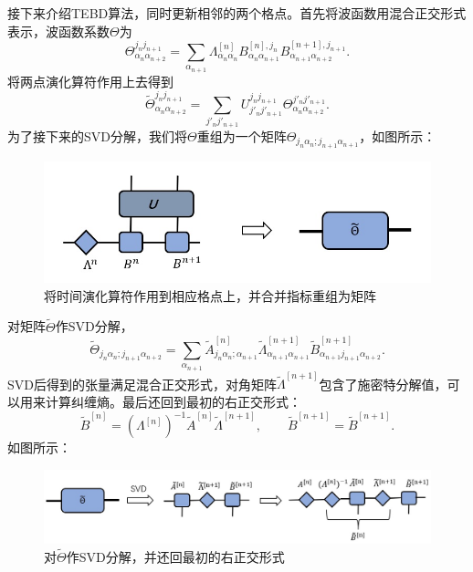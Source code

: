 \documentclass[12pt]{article}
\begin{document}
     接下来介绍TEBD算法\cite{hauschild2018efficient}，同时更新相邻的两个格点。首先将波函数用混合正交形式表示，波函数系数$\Theta$为
     \begin{equation}\Theta_{\alpha_n\alpha_{n+2}}^{j_nj_{n+1}}=\sum_{\alpha_{n+1}}\Lambda_{\alpha_n\alpha_n}^{[n]}B_{\alpha_n\alpha_{n+1}}^{[n],j_n}B_{\alpha_{n+1}\alpha_{n+2}}^{[n+1],j_{n+1}}.\end{equation}
     将两点演化算符作用上去得到
     \begin{equation}\tilde{\Theta}_{\alpha_n\alpha_{n+2}}^{j_nj_{n+1}}=\sum_{j'_nj'_{n+1}}U_{j'_nj'_{n+1}}^{j_nj_{n+1}}\Theta_{\alpha_n\alpha_{n+2}}^{j'_nj'_{n+1}}.\end{equation}
     为了接下来的SVD分解，我们将$\Theta$重组为一个矩阵$\Theta_{j_n\alpha_n;j_{n+1}\alpha_{n+1}}$，如图所示：
     \begin{figure}[H]
     	\centering
     	\includegraphics[scale=0.8]{16.TEBD1step}
     	\caption[9pt]{将时间演化算符作用到相应格点上，并合并指标重组为矩阵}
     	\label{fig:16}
     \end{figure}
     对矩阵$\tilde{\Theta}$作SVD分解，
     \begin{equation}\tilde{\Theta}_{j_n\alpha_n;j_{n+1}\alpha_{n+2}}=\sum_{\alpha_{n+1}}\tilde{A}_{j_n\alpha_n;\alpha_{n+1}}^{[n]}\tilde{\Lambda}_{\alpha_{n+1}\alpha_{n+1}}^{[n+1]}\tilde{B}_{\alpha_{n+1}j_{n+1}\alpha_{n+2}}^{[n+1]}.\end{equation}
     SVD后得到的张量满足混合正交形式，对角矩阵$\tilde{\Lambda}^{[n+1]}$包含了施密特分解值，可以用来计算纠缠熵。最后还回到最初的右正交形式：
     \begin{equation}\tilde{B}^{[n]}=(\Lambda^{[n]})^{-1}\tilde{A}^{[n]}\tilde{\Lambda}^{[n+1]},\qquad \tilde{B}^{[n+1]}=\tilde{B}^{[n+1]} .\end{equation}
     如图所示：
     \begin{figure}[H]
     	\centering
     	\includegraphics[scale=0.7]{17.TEBD2step}
     	\caption[9pt]{对$\tilde{\Theta}$作SVD分解，并还回最初的右正交形式}
     	\label{fig:17}
     \end{figure}
     
\end{document}
